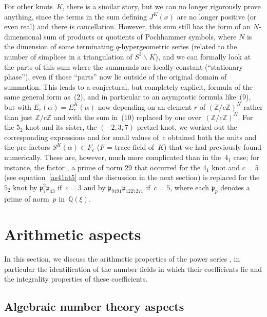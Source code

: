 \documentclass[pdftex]{sigma}
\numberwithin{equation}{section}
\def\a{\alpha}
\def\p{\mathfrak p}
\def\Z{\mathbb Z}
\def\Q{\mathbb Q}
\def\a{\alpha}
\def\s{\sigma}
\def\J{\mathbf J} \def\J{J} %
\def\ve{\varepsilon}
\def\ssm{\smallsetminus}
\begin{document}
For other knots~$K$, there is a similar story, but we can no longer
rigorously prove anything, since the terms in
the sum defining $\J^K(x)$ are no longer positive (or even real) and
there is cancellation. However, this sum still has the form of an
$N$-dimensional sum of products or quotients of Pochhammer symbols, where
$N$ is the dimension of some terminating $q$-hypergeometric series (related
to the number of simplices in a triangulation of $S^3\ssm K$),
and we can formally look at the parts of this sum where the summands are
locally constant (``stationary phase''), even if those ``parts'' now lie
outside of the original domain of summation. This leads to a conjectural,
but completely explicit, formula of the same general form as~(2), and in
particular to an asymptotic formula like~(9), but with $E_r(\a)=E^K_r(\a)$
now depending on an element $r$ of $(\Z/c\Z)^N$ rather than just $\Z/c\Z$ and
with the sum in~(10) replaced by one over~$(\Z/c\Z)^N$. For the $5_2$ knot
and its sister, the $(-2,3,7)$ pretzel knot, we worked out the
corresponding expressions and for small values of~$c$ obtained both the units
and the pre-factors $S^K(\a)\in F_c$ ($F$ = trace field of~$K$) that we had
previously found numerically. These are, however, much more complicated
than in the~$4_1$ case; for instance, the factor
\smash{$\p_{29}=2-\ve^{(a)}_1+\ve^{(a)}_2+2\ve^{(a)}_3$}, a prime of norm 29
that occurred for the $4_1$ knot and $c=5$ (see equation~\eqref{as41at5} and the
discussion in the next section) is replaced for the $5_2$ knot by $\p_7^2 \p_{43}$
if~$c=3$ and by $\p_{9491}\p_{1227271}$ if~$c=5$, where each $\p_p$ denotes a
prime of norm~$p$ in~$\Q(\xi)$.


\section{Arithmetic aspects}
\label{sec.arithmetic}

In this section, we discuss the arithmetic properties of the power series
\smash{$\Phi_\a^{(K,\s)}(h)$}, in particular the identification of the number fields in which
their coefficients lie and the integrality properties of these coefficients.

\subsection{Algebraic number theory aspects}
\label{sub.field}
\end{document}

